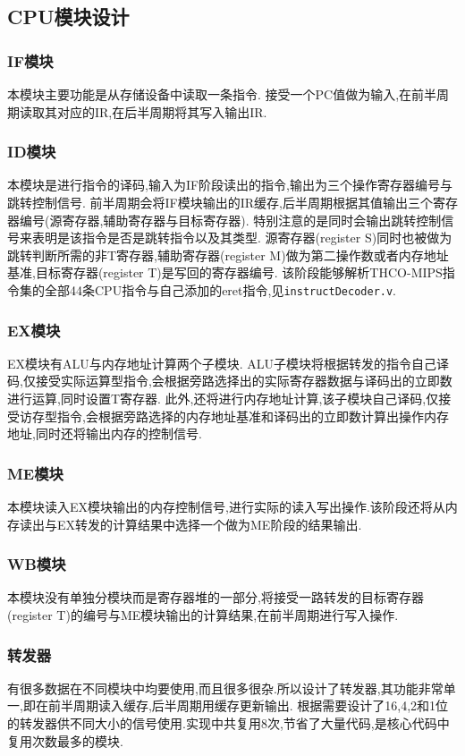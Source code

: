 \subsection{CPU模块设计}
  \subsubsection{IF模块}
    本模块主要功能是从存储设备中读取一条指令.
    接受一个PC值做为输入,在前半周期读取其对应的IR,在后半周期将其写入输出IR.
  \subsubsection{ID模块}
    本模块是进行指令的译码,输入为IF阶段读出的指令,输出为三个操作寄存器编号与跳转控制信号.
    前半周期会将IF模块输出的IR缓存,后半周期根据其值输出三个寄存器编号(源寄存器,辅助寄存器与目标寄存器).
    特别注意的是同时会输出跳转控制信号来表明是该指令是否是跳转指令以及其类型.
    源寄存器(register S)同时也被做为跳转判断所需的非T寄存器,辅助寄存器(register M)做为第二操作数或者内存地址基准,目标寄存器(register T)是写回的寄存器编号.
    该阶段能够解析THCO-MIPS指令集的全部44条CPU指令与自己添加的eret指令,见\verb|instructDecoder.v|.
  \subsubsection{EX模块}
    EX模块有ALU与内存地址计算两个子模块.
    ALU子模块将根据转发的指令自己译码,仅接受实际运算型指令,会根据旁路选择出的实际寄存器数据与译码出的立即数进行运算,同时设置T寄存器.
    此外,还将进行内存地址计算,该子模块自己译码,仅接受访存型指令,会根据旁路选择的内存地址基准和译码出的立即数计算出操作内存地址,同时还将输出内存的控制信号.
  \subsubsection{ME模块}
    本模块读入EX模块输出的内存控制信号,进行实际的读入写出操作.该阶段还将从内存读出与EX转发的计算结果中选择一个做为ME阶段的结果输出.
  \subsubsection{WB模块}
    本模块没有单独分模块而是寄存器堆的一部分,将接受一路转发的目标寄存器(register T)的编号与ME模块输出的计算结果,在前半周期进行写入操作.

  \subsubsection{转发器}
    有很多数据在不同模块中均要使用,而且很多很杂.所以设计了转发器,其功能非常单一,即在前半周期读入缓存,后半周期用缓存更新输出.
    根据需要设计了16,4,2和1位的转发器供不同大小的信号使用.实现中共复用8次,节省了大量代码,是核心代码中复用次数最多的模块.
